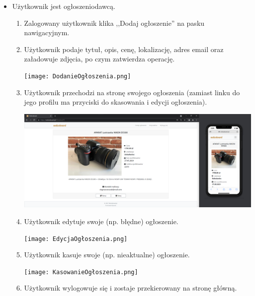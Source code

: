 \documentclass{article}
\begin{document}
\begin{itemize}
    \item Użytkownik jest ogłoszeniodawcą.
            \begin{enumerate}
            \item Zalogowany użytkownik klika ,,Dodaj ogłoszenie'' na pasku nawigacyjnym.
            \item Użytkownik podaje tytuł, opis, cenę, lokalizację, adres email oraz załadowuje zdjęcia, po czym zatwierdza operację.
            \begin{center}
                    \centering  \texttt{[image: DodanieOgłoszenia.png]}
            \end{center}
            \item Użytkownik przechodzi na stronę swojego ogłoszenia (zamiast linku do jego profilu ma przyciski do skasowania i edycji ogłoszenia).
            \begin{center}
                    \centering  \includegraphics[width=15.5cm]{StronaOgłoszeniaWłaściciel.png}
            \end{center}
            \item Użytkownik edytuje swoje (np. błędne) ogłoszenie.
            \begin{center}
                 \texttt{[image: EdycjaOgłoszenia.png]}
            \end{center}
            \item Użytkownik kasuje swoje (np. nieaktualne) ogłoszenie.
            \begin{center}
                    \centering  \texttt{[image: KasowanieOgłoszenia.png]}
            \end{center}
            \item Użytkownik wylogowuje się i zostaje przekierowany na stronę główną.
        \end{enumerate}
    \end{itemize}
\end{document}
